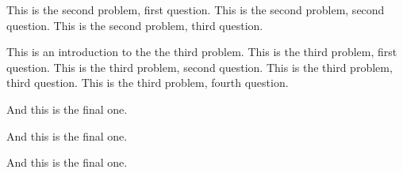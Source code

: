 \documentclass{cisXXX} %
\begin{document}
\HWproblem
\HWsubproblem
This is the second problem, first question.
\HWsubproblem
This is the second problem, second question.
\HWsubproblem
This is the second problem, third question.


\HWproblem
This is an introduction to the the third problem.
\HWsubproblem
This is the third problem, first question.
\HWsubproblem
This is the third problem, second question.
\HWsubproblem
This is the third problem, third question.
\HWsubproblem
This is the third problem, fourth question.

\HWproblem
And this is the final one.

And this is the final one.

And this is the final one.
\end{document}
